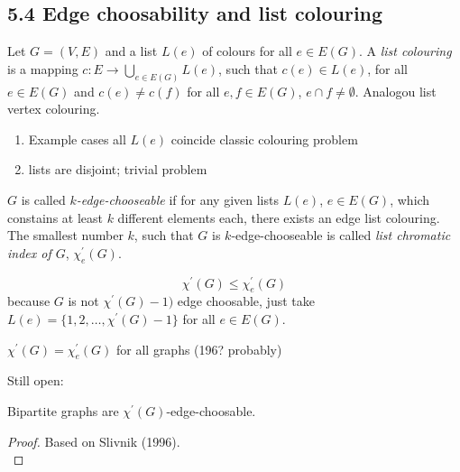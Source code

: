 \documentclass[aagt.tex]{subfiles}
\begin{document}
\subsection{5.4 Edge choosability and list colouring}

\begin{defi*}
  Let $G=(V,E)$ and a list $L(e)$ of colours for all $e \in E(G)$.
  A \emph{list colouring} is a mapping $c: E \to \bigcup_{e \in E(G)} L(e)$, such that $c(e) \in L(e)$, for all $e \in E(G)$ and $c(e) \neq c(f)$ for all $e,f \in E(G)$, $e \cap f \neq \emptyset$.
  Analogou list vertex colouring.
\end{defi*}

\begin{ex}
\end{ex}

\begin{rem}
  \begin{enumerate}
    \item Example cases all $L(e)$ coincide classic colouring problem
    \item lists are disjoint; trivial problem
  \end{enumerate}
\end{rem}

\begin{defi*}
  $G$ is called \emph{$k$-edge-chooseable} if for any given lists $L(e)$, $e \in E(G)$, which constains at least $k$ different elements each, there exists an edge list colouring.
  The smallest number $k$, such that $G$ is $k$-edge-chooseable is called \emph{list chromatic index of $G$}, $\chi_e^\prime(G)$.
\end{defi*}

\[\chi^\prime(G) \leq \chi_e^\prime(G) \]
because $G$ is not $\chi^\prime(G) -1)$ edge choosable, just take $L(e) = \{1,2,\dots,\chi^\prime(G) -1 \}$ for all $e \in E(G)$.

\begin{conj}[Vizing]
  $\chi^\prime(G) = \chi_e^\prime(G)$ for all graphs (196? probably)
\end{conj}

Still open: 

\begin{theorem}[5.10 Galvin 1995]\label{th_5_10}
  Bipartite graphs are $\chi^\prime(G)$-edge-choosable.
\end{theorem}

\begin{proof}
  Based on Slivnik (1996).\\
\end{proof}
\end{document}

